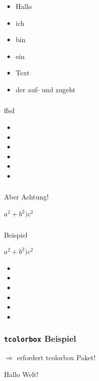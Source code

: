 \documentclass[14pt,ngerman]{beamer}
\begin{document}
\begin{frame}
\frametitle{}

\begin{itemize}[<+->]
\item Hallo
\item ich 
\item bin
\item ein
\item Text
\item der auf- und zugeht
\end{itemize}
\end{frame}


\begin{frame}
\frametitle{}

\begin{block}{ffsd}
\begin{itemize}
\item 
\item 
\item 
\item 
\item 
\item 
\end{itemize}
\end{block}


\end{frame}


\begin{frame}
\frametitle{}


\begin{alertblock}{Aber Achtung!}

\(a^2 + b^2 ) c^2\)

\end{alertblock}
\end{frame}


\begin{frame}
\frametitle{}


\begin{exampleblock}{Beispiel}

\(a^2 + b^2 ) c^2\)

\end{exampleblock}

\begin{itemize}
	\item 
	\item 
	\item 
	\item 
	\item 
	\item 
	\end{itemize}

\end{frame}

\begin{frame}
\frametitle{\texttt{tcolorbox} Beispiel}

\(\Rightarrow\) erfordert tcolorbox Paket!

\begin{tcolorbox}
Hallo Welt!
\end{tcolorbox}

\end{frame}

\begin{frame}
\frametitle{}




\end{frame}
\end{document}
